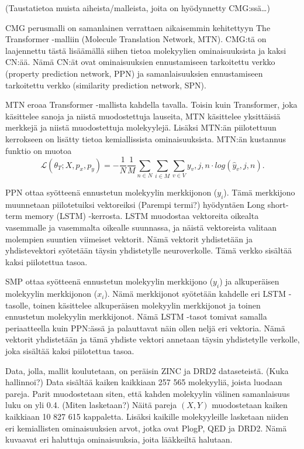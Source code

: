 \documentclass[finnish,twoside,censored,subject,sw-line]{HYthesisML}
\begin{document}
(Taustatietoa muista aiheista/malleista, joita on hyödynnetty CMG:ssä\dots)

CMG perusmalli on samanlainen verrattaen aikaisemmin kehitettyyn The Transformer -malliin (Molecule Translation Network, MTN).\cite{TheTransformer}
CMG:tä on laajennettu tästä lisäämällä siihen tietoa molekyylien ominaisuuksista ja kaksi CN:ää.
Nämä CN:ät ovat ominaisuuksien ennustamiseen tarkoitettu verkko (property prediction network, PPN) ja samanlaisuuksien ennustamiseen tarkoitettu verkko (similarity prediction network, SPN).

MTN eroaa Transformer -mallista kahdella tavalla.
Toisin kuin Transformer, joka käsittelee sanoja ja niistä muodostettuja lauseita, MTN käsittelee yksittäisiä merkkejä ja niistä muodostettuja molekyylejä.
Lisäksi MTN:än piilotettuun kerrokseen on lisätty tietoa kemiallissista ominaisuuksista.
MTN:än kustannus funktio on muotoa \[\mathcal{L} (\theta_T;X,p_x,p_y) = -\frac{1}{N}\frac{1}{M}\sum_{n \in N}\sum_{i \in M}\sum_{v \in V}y_v,j,n \cdot log(\hat{y}_v,j,n).\]

PPN ottaa syötteenä ennustetun molekyylin merkkijonon ($y_i$).
Tämä merkkijono muunnetaan piilotetuiksi vektoreiksi (Parempi termi?) hyödyntäen Long short-term memory (LSTM) -kerrosta.
LSTM muodostaa vektoreita oikealta vasemmalle ja vasemmalta oikealle suunnassa, ja näistä vektoreista valitaan molempien suuntien viimeiset vektorit.
Nämä vektorit yhdistetään ja yhdistevektori syötetään täysin yhdistetylle neuroverkolle.
Tämä verkko sisältää kaksi piilotettua tasoa.

SMP ottaa syötteenä ennustetun molekyylin merkkijono ($y_i$) ja alkuperäisen molekyylin merkkijonon ($x_i$).
Nämä merkkijonot syötetään kahdelle eri LSTM -tasolle, toinen käsittelee alkuperäisen molekyylin merkkijonot ja toinen ennustetun molekyylin merkkijonot.
Nämä LSTM -tasot tomivat samalla periaatteella kuin PPN:ässä ja palauttavat näin ollen neljä eri vektoria.
Nämä vektorit yhdistetään ja tämä yhdiste vektori annetaan täysin yhdistetylle verkolle, joka sisältää kaksi piilotettua tasoa.

Data, jolla, mallit koulutetaan, on peräisin ZINC ja DRD2 dataseteistä. (Kuka hallinnoi?)
Data sisältää kaiken kaikkiaan 257 565 molekyyliä, joista luodaan pareja.
Parit muodostetaan siten, että kahden molekyylin välinen samanlaisuus luku on yli 0.4. (Miten lasketaan?)
Näitä pareja $(X,Y)$ muodostetaan kaiken kaikkiaan 10 827 615 kappaletta.
Lisäksi kaikille molekyyleille lasketaan niiden eri kemiallisten ominaisuuksien arvot, jotka ovat PlogP, QED ja DRD2.
Nämä kuvaavat eri haluttuja ominaisuuksia, joita lääkkeiltä halutaan.
\end{document}
